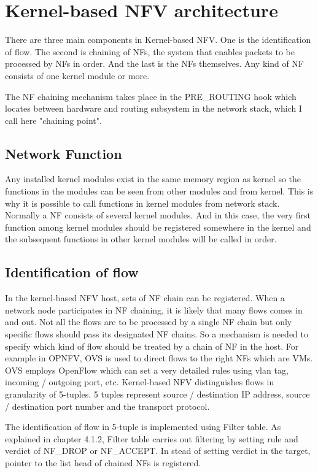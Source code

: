 \section{Kernel-based NFV architecture}
There are three main components in Kernel-based NFV. One is the identification of flow. The second is chaining of NFs, the system that enables packets to be processed by NFs in order. And the last is the NFs themselves. Any kind of NF consists of one kernel module or more. 

The NF chaining mechanism takes place in the PRE\_ROUTING hook which locates between hardware and routing subsystem in the network stack, which I call here "chaining point". 

\subsection{Network Function}
Any installed kernel modules exist in the same memory region as kernel so the functions in the modules can be seen from other modules and from kernel. This is why it is possible to call functions in kernel modules from network stack. Normally a NF consists of several kernel modules. And in this case, the very first function among kernel modules should be registered somewhere in the kernel and the subsequent functions in other kernel modules will be called in order. 

\subsection{Identification of flow}
In the kernel-based NFV host, sets of NF chain can be registered. When a network node participates in NF chaining, it is likely that many flows comes in and out. Not all the flows are to be processed by a single NF chain but only specific flows should pass its designated NF chains. So a mechanism is needed to specify which kind of flow should be treated by a chain of NF in the host. For example in OPNFV, OVS is used to direct flows to the right NFs which are VMs. OVS employs OpenFlow which can set a very detailed rules using vlan tag, incoming / outgoing port, etc. Kernel-based NFV distinguishes flows in granularity of 5-tuples. 5 tuples represent source / destination IP address, source / destination port number and the transport protocol. 

The identification of flow in 5-tuple is implemented using Filter table. As explained in chapter 4.1.2, Filter table carries out filtering by setting rule and verdict of NF\_DROP or NF\_ACCEPT. In stead of setting verdict in the target, pointer to the list head of chained NFs is registered. 

